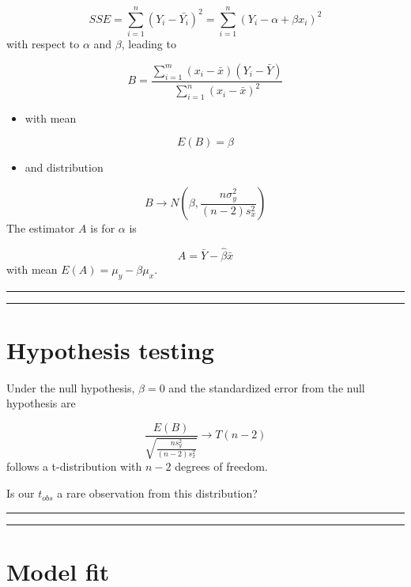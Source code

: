 \documentclass[
]{book}
\providecommand{\tightlist}{%
  \setlength{\itemsep}{0pt}\setlength{\parskip}{0pt}}
\begin{document}
\[SSE=\sum_{i=1}^n(Y_i-\bar{Y_i})^2=\sum_{i=1}^n(Y_i-\alpha + \beta x_i)^2\]
with respect to \(\alpha\) and \(\beta\), leading to

\[B=\frac{\sum_{i=1}^m(x_i-\bar{x})(Y_i-\bar{Y})}{\sum_{i=1}^n(x_i-\bar{x})^2}\]

\begin{itemize}
\tightlist
\item
  with mean
\end{itemize}

\[E(B)=\beta\]

\begin{itemize}
\tightlist
\item
  and distribution
\end{itemize}

\[B \rightarrow N(\beta, \frac{n\sigma^2_y}{{(n-2)s^2_x}})\]
The estimator \(A\) is for \(\alpha\) is

\[A=\bar{Y}-\hat{\beta}\bar{x} \]
with mean \(E(A)=\mu_y-\beta\mu_x\).

\begin{center}\rule{0.5\linewidth}{0.5pt}\end{center}

\begin{center}\rule{0.5\linewidth}{0.5pt}\end{center}

\hypertarget{hypothesis-testing-6}{%
\section{Hypothesis testing}\label{hypothesis-testing-6}}

Under the null hypothesis, \(\beta=0\) and the standardized error from the null hypothesis are

\[\frac{E(B)}{\sqrt{\frac{ns^2_y}{{(n-2)s^2_x}}}} \rightarrow T(n-2)\]
follows a t-distribution with \(n-2\) degrees of freedom.

Is our \(t_{obs}\) a rare observation from this distribution?

\begin{center}\rule{0.5\linewidth}{0.5pt}\end{center}

\begin{center}\rule{0.5\linewidth}{0.5pt}\end{center}

\hypertarget{model-fit}{%
\section{Model fit}\label{model-fit}}
\end{document}
